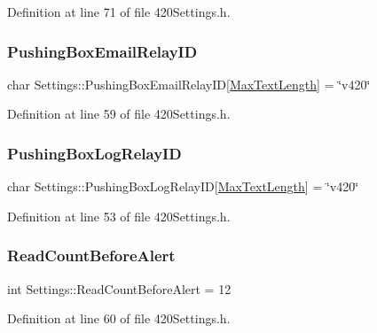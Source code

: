 Definition at line 71 of file 420\+Settings.\+h.

\mbox{\label{struct_settings_aaaa2bdabbe0ea51ea21faf6e1a8563ed}} 
\subsubsection{\texorpdfstring{PushingBoxEmailRelayID}{PushingBoxEmailRelayID}}
{\footnotesize\ttfamily char Settings\+::\+Pushing\+Box\+Email\+Relay\+ID\mbox{[}\mbox{\hyperlink{420_settings_8h_a1b8e1e4d41c8b790a064405b0c219a6c}{Max\+Text\+Length}}\mbox{]} = \char`\"{}v420\char`\"{}}



Definition at line 59 of file 420\+Settings.\+h.

\mbox{\label{struct_settings_a11215ddb067966c42e89de5b6fec802f}} 
\subsubsection{\texorpdfstring{PushingBoxLogRelayID}{PushingBoxLogRelayID}}
{\footnotesize\ttfamily char Settings\+::\+Pushing\+Box\+Log\+Relay\+ID\mbox{[}\mbox{\hyperlink{420_settings_8h_a1b8e1e4d41c8b790a064405b0c219a6c}{Max\+Text\+Length}}\mbox{]} = \char`\"{}v420\char`\"{}}



Definition at line 53 of file 420\+Settings.\+h.

\mbox{\label{struct_settings_a1ec02930a5369af829e9bab51d4dc83b}} 
\subsubsection{\texorpdfstring{ReadCountBeforeAlert}{ReadCountBeforeAlert}}
{\footnotesize\ttfamily int Settings\+::\+Read\+Count\+Before\+Alert = 12}



Definition at line 60 of file 420\+Settings.\+h.

